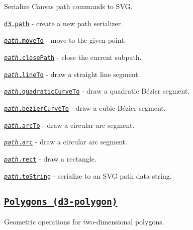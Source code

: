 Serialize Canvas path commands to S\+VG.


\begin{DoxyItemize}
\item \href{https://github.com/d3/d3-path/blob/master/README.md#path}{\tt d3.\+path} -\/ create a new path serializer.
\item \href{https://github.com/d3/d3-path/blob/master/README.md#path_moveTo}{\tt {\itshape path}.move\+To} -\/ move to the given point.
\item \href{https://github.com/d3/d3-path/blob/master/README.md#path_closePath}{\tt {\itshape path}.close\+Path} -\/ close the current subpath.
\item \href{https://github.com/d3/d3-path/blob/master/README.md#path_lineTo}{\tt {\itshape path}.line\+To} -\/ draw a straight line segment.
\item \href{https://github.com/d3/d3-path/blob/master/README.md#path_quadraticCurveTo}{\tt {\itshape path}.quadratic\+Curve\+To} -\/ draw a quadratic Bézier segment.
\item \href{https://github.com/d3/d3-path/blob/master/README.md#path_bezierCurveTo}{\tt {\itshape path}.bezier\+Curve\+To} -\/ draw a cubic Bézier segment.
\item \href{https://github.com/d3/d3-path/blob/master/README.md#path_arcTo}{\tt {\itshape path}.arc\+To} -\/ draw a circular arc segment.
\item \href{https://github.com/d3/d3-path/blob/master/README.md#path_arc}{\tt {\itshape path}.arc} -\/ draw a circular arc segment.
\item \href{https://github.com/d3/d3-path/blob/master/README.md#path_rect}{\tt {\itshape path}.rect} -\/ draw a rectangle.
\item \href{https://github.com/d3/d3-path/blob/master/README.md#path_toString}{\tt {\itshape path}.to\+String} -\/ serialize to an S\+VG path data string.
\end{DoxyItemize}

\subsection*{\href{https://github.com/d3/d3-polygon}{\tt Polygons (d3-\/polygon)}}

Geometric operations for two-\/dimensional polygons.


